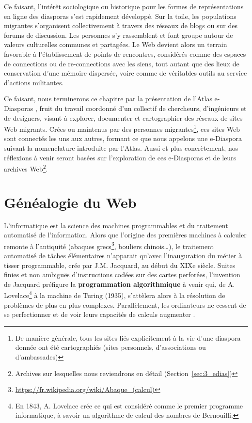 \documentclass[symmetric,justified,marginals=raggedouter]{tufte-book}
\begin{document}
Ce faisant, l'intérêt sociologique ou historique pour les formes de représentations en ligne des diasporas s'est rapidement développé. Sur la toile, les populations migrantes s'organisent collectivement à travers des réseaux de blogs ou sur des forums de discussion. Les personnes s'y rassemblent et font groupe autour de valeurs culturelles communes et partagées. Le Web devient alors un terrain favorable à l'établissement de points de rencontres, considérés comme des espaces de connections ou de re-connections avec les siens, tout autant que des lieux de conservation d'une mémoire dispersée, voire comme de véritables outils au service d'actions militantes.

Ce faisant, nous terminerons ce chapitre par la présentation de l'Atlas e-Diasporas \citep{diminescu_e-diasporas_2012}, fruit du travail coordonné d'un collectif de cher\-cheurs, d'ingénieurs et de designers, visant à explorer, documenter et cartographier des réseaux de sites Web migrants. Crées ou maintenus par des personnes migrantes\footnote{\RaggedOuter De manière générale, tous les sites liés explicitement à la vie d'une diaspora donnée ont été cartographiés (sites personnels, d'associations ou d'ambassades)}, ces sites Web sont connectés les uns aux autres, formant ce que nous appelons une e-Diaspora suivant la nomenclature introduite par l'Atlas. Aussi et plus concrètement, nos réflexions à venir seront basées sur l'exploration de ces e-Diasporas et de leurs archives Web\footnote{\RaggedOuter Archives sur lesquelles nous reviendrons en détail (Section~\ref{sec:3_edias})}.

\section{Généalogie du Web}
\label{sec:2_web}

\noindent L'informatique est la science des machines programmables et du traitement automatisé de l'information. Alors que l'origine des premières machines à calculer remonte à l'antiquité (abaques grecs\footnote{\RaggedOuter \url{https://fr.wikipedia.org/wiki/Abaque\_(calcul)}}, bouliers chinois\ldots{}), le traitement automatisé de tâches élémentaires n'apparait qu'avec l'inauguration du métier à tisser programmable, crée par J.M. Jacquard, au début du XIXe siècle. Suites finies et non ambiguës d'instructions codées sur des cartes perforées, l'invention de Jacquard préfigure la \textbf{programmation algorithmique} à venir qui, de A. Lovelace\footnote{\RaggedOuter En 1843, A. Lovelace crée ce qui est considéré comme le premier programme informatique, à savoir un algorithme de calcul des nombres de Bernouilli.} à la machine de Turing (1935), s'attèlera alors à la résolution de problèmes de plus en plus complexes. Parallèlement, les ordinateurs ne cessent de se perfectionner et de voir leurs capacités de calculs augmenter \citep{lazard_histoire_2016}.
\end{document}
